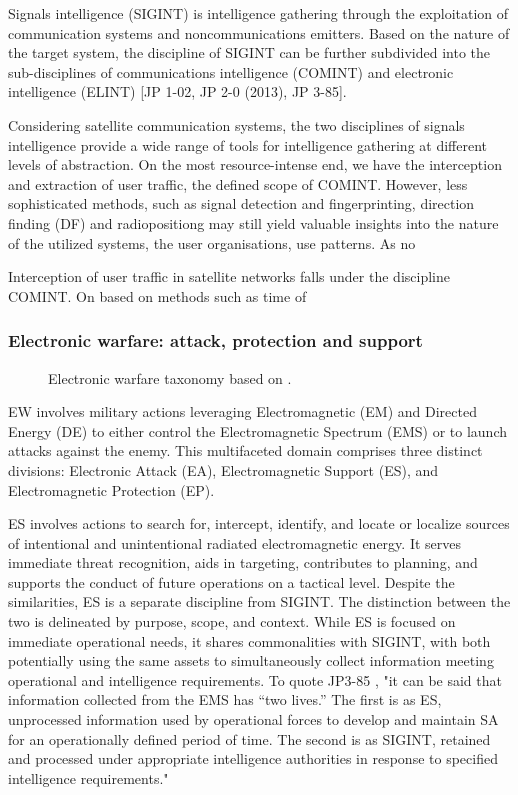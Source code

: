 \documentclass[english, 12pt, a4paper, elec, utf8, a-1b, online]{aaltothesis}
\begin{document}
Signals intelligence (SIGINT) is intelligence gathering through the exploitation of communication systems and noncommunications emitters.
Based on the nature of the target system, the discipline of SIGINT can be further subdivided into the sub-disciplines of communications intelligence (COMINT) and electronic intelligence (ELINT) \cite{national2015bulk} [JP 1-02, JP 2-0 (2013), JP 3-85].

Considering satellite communication systems, the two disciplines of signals intelligence provide a wide range of tools for intelligence gathering at different levels of abstraction.
On the most resource-intense end, we have the interception and extraction of user traffic, the defined scope of COMINT.
However, less sophisticated methods, such as signal detection and fingerprinting, direction finding (DF) and radiopositiong may still yield valuable insights into the nature of the utilized systems, the user organisations, use patterns.
As no 

Interception of user traffic in satellite networks falls under the discipline COMINT. On  based on methods such as time of 

\subsubsection{Electronic warfare: attack, protection and support}

\begin{figure}[h]
  \centering
  
  \caption{Electronic warfare taxonomy based on \cite{kosola2013digitaalinen}.}
  \label{fig-electronic-warfare}
\end{figure}

EW involves military actions leveraging Electromagnetic (EM) and Directed Energy (DE) to either control the Electromagnetic Spectrum (EMS) or to launch attacks against the enemy. This multifaceted domain comprises three distinct divisions: Electronic Attack (EA), Electromagnetic Support (ES), and Electromagnetic Protection (EP).

ES involves actions to search for, intercept, identify, and locate or localize sources of intentional and unintentional radiated electromagnetic energy. It serves immediate threat recognition, aids in targeting, contributes to planning, and supports the conduct of future operations on a tactical level. Despite the similarities, ES is a separate discipline from SIGINT. The distinction between the two is delineated by purpose, scope, and context. While ES is focused on immediate operational needs, it shares commonalities with SIGINT, with both potentially using the same assets to simultaneously collect information meeting operational and intelligence requirements.
To quote JP3-85 \cite{jp3-85}, "it can be said that information collected from the EMS has “two lives.” The first is as ES, unprocessed information used by operational forces to develop and maintain SA for an operationally defined period of time. The second is as SIGINT, retained and processed under appropriate intelligence authorities in response to specified intelligence requirements." %
\end{document}
